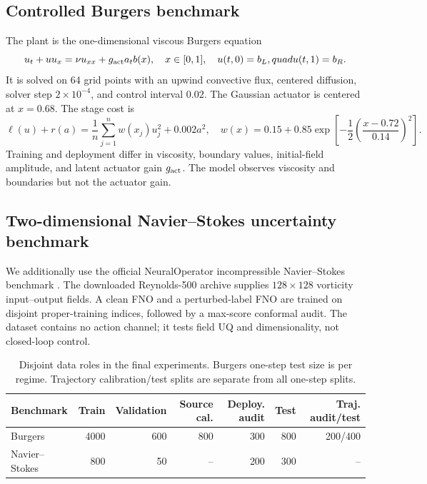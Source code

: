 \documentclass[10pt]{article}
\begin{document}
\subsection{Controlled Burgers benchmark}

The plant is the one-dimensional viscous Burgers equation
\begin{equation}
u_t+uu_x=\nu u_{xx}+g_{\rm act}a_tb(x),
\quad x\in[0,1],
\quad u(t,0)=b_L,quad u(t,1)=b_R.
\label{eq:burgers}
\end{equation}
It is solved on 64 grid points with an upwind convective flux, centered
diffusion, solver step $2\times10^{-4}$, and control interval $0.02$. The
Gaussian actuator is centered at $x=0.68$. The stage cost is
\begin{equation}
\ell(u)+r(a)=\frac1n\sum_{j=1}^{n}w(x_j)u_j^2+0.002a^2,
\quad
w(x)=0.15+0.85\exp\!\left[-\frac12
\left(\frac{x-0.72}{0.14}\right)^2\right].
\label{eq:burgers-cost}
\end{equation}
Training and deployment differ in viscosity, boundary values, initial-field
amplitude, and latent actuator gain $g_{\rm act}$. The model observes
viscosity and boundaries but not the actuator gain.

\subsection{Two-dimensional Navier--Stokes uncertainty benchmark}

We additionally use the official NeuralOperator incompressible
Navier--Stokes benchmark \cite{neuraloperator2024ns}. The downloaded
Reynolds-500 archive supplies $128\times128$ vorticity input--output fields.
A clean FNO and a perturbed-label FNO are trained on disjoint proper-training
indices, followed by a max-score conformal audit. The dataset contains no
action channel; it tests field UQ and dimensionality, not closed-loop control.

\begin{table}[t]
\centering
\small
\caption{Disjoint data roles in the final experiments. Burgers one-step test
size is per regime. Trajectory calibration/test splits are separate from all
one-step splits.}
\label{tab:splits}
\begin{tabular}{lrrrrrr}
\toprule
Benchmark & Train & Validation & Source cal. & Deploy. audit & Test & Traj. audit/test\\
\midrule
Burgers & 4000 & 600 & 800 & 300 & 800 & 200/400\\
Navier--Stokes & 800 & 50 & -- & 200 & 300 & --\\
\bottomrule
\end{tabular}
\end{table}
\end{document}
